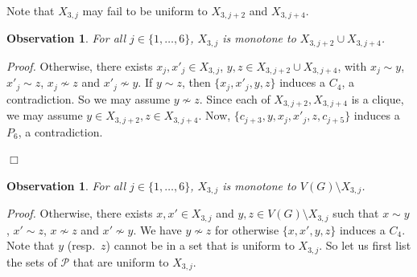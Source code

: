 \documentclass[12pt]{article}
\newtheorem{Observation}[Theorem]{Observation}
\newcommand{\qed}{\hfill $\Box$}
\begin{document}
\medskip

Note that $X_{3, j}$ may fail to be uniform to $X_{3, j+2}$ and $X_{3, j+4}$. 


\begin{Observation}\label{obs:X3P4}
	For all $j\in \{1, \dots, 6\}$, $X_{3, j}$ is monotone to $X_{3, j+2} \cup X_{3, j+4}$. 
\end{Observation}

\noindent

{\it Proof.}
Otherwise, there exists $x_j, x'_j\in X_{3, j}$,  $y, z \in X_{3, j+2} \cup X_{3, j+4}$, with $x_j\sim y$,  $x'_j \sim z$, $x_j\not\sim z$ and $x'_j \not\sim y$. If $y \sim z$, then $\{x_j, x'_j, y, z\}$ induces a $C_4$, a contradiction. So we may assume $y \not\sim z$. Since each of $X_{3, j+2},  X_{3, j+4}$ is a clique, we may assume $y \in X_{3,j+2}, z \in X_{3,j+4}$. Now, $\{c_{j+3}, y, x_j, x'_j, z, c_{j+5}\}$ induces a $P_6$, a contradiction.



\qed


\begin{Observation}\label{obs:X3Mon}
	For all $j\in \{1, \dots, 6\}$, $X_{3, j}$ is monotone to $V(G) \setminus X_{3, j}$. 
\end{Observation}

\noindent
{\it Proof.} 
Otherwise, there exists $x, x'\in X_{3, j}$ and $y, z\in V(G) \setminus X_{3, j}$ such that $x\sim y$,  $x' \sim z$, $x\not\sim z$ and $x' \not\sim y$. We have $y\not\sim z$ for otherwise
$\{x, x', y, z\}$ induces a $C_4$.	Note that $y$ (resp.\ $z$) cannot be in a set that is uniform to $X_{3, j}$. So let us first list the sets of $\mathcal P$ that are uniform to $X_{3, j}$. 
\end{document}
